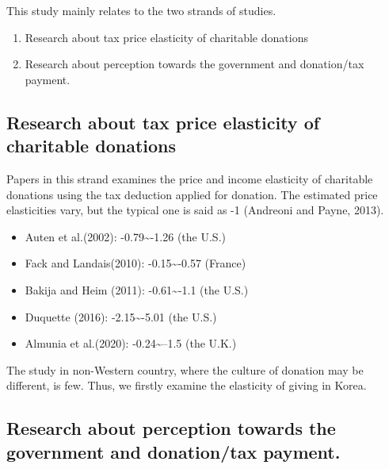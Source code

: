 \documentclass[ review  , 3p ]{elsarticle}
\providecommand{\tightlist}{%
  \setlength{\itemsep}{0pt}\setlength{\parskip}{0pt}}
\begin{document}
  This study mainly relates to the two strands of studies.
  
  \begin{enumerate}
  \def\labelenumi{\arabic{enumi}.}
  \tightlist
  \item
    Research about tax price elasticity of charitable donations
  \item
    Research about perception towards the government and donation/tax payment.
  \end{enumerate}
  
  \hypertarget{research-about-tax-price-elasticity-of-charitable-donations}{%
  \subsection{Research about tax price elasticity of charitable donations}\label{research-about-tax-price-elasticity-of-charitable-donations}}
  
  Papers in this strand examines the price and income elasticity of charitable donations using the tax deduction applied for donation.
  The estimated price elasticities vary, but the typical one is said as -1 (Andreoni and Payne, 2013).
  
  \begin{itemize}
  \tightlist
  \item
    Auten et al.(2002): -0.79\textasciitilde{}-1.26 (the U.S.)
  \item
    Fack and Landais(2010): -0.15\textasciitilde{}-0.57 (France)
  \item
    Bakija and Heim (2011): -0.61\textasciitilde{}-1.1 (the U.S.)
  \item
    Duquette (2016): -2.15\textasciitilde{}-5.01 (the U.S.)
  \item
    Almunia et al.(2020): -0.24\textasciitilde{}--1.5 (the U.K.)
  \end{itemize}
  
  The study in non-Western country, where the culture of donation may be different, is few.
  Thus, we firstly examine the elasticity of giving in Korea.
  
  \hypertarget{research-about-perception-towards-the-government-and-donationtax-payment.}{%
  \subsection{Research about perception towards the government and donation/tax payment.}\label{research-about-perception-towards-the-government-and-donationtax-payment.}}
  
\end{document}
